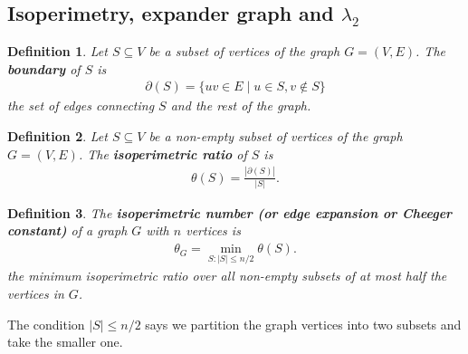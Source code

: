 \documentclass[]{article}
\newtheorem{definition}{Definition}[section] %
\begin{document}
	\subsection{Isoperimetry, expander graph and $\lambda_2$}
	\begin{definition}
		Let $S \subseteq V$ be a subset of vertices of the graph $G=(V,E)$. The \textbf{boundary} of $S$ is 
		\begin{align*}
		\partial(S) = \{uv \in E \mid u \in S, v \notin S\}
		\end{align*}
		the set of edges connecting $S$ and the rest of the graph. 
	\end{definition}
	
	\begin{definition}
		Let $S \subseteq V$ be a non-empty subset of vertices of the graph $G=(V,E)$. The \textbf{isoperimetric ratio} of $S$ is 
		\begin{align*}
		\theta(S) = \frac{|\partial(S)|}{|S|}.
		\end{align*}
	\end{definition}
	
	\begin{definition}
		The \textbf{isoperimetric number (or edge expansion or Cheeger constant)} of a graph $G$ with $n$ vertices is  
		\begin{align*}
		\theta_G = \min_{S:|S|\le n/2} \theta(S).
		\end{align*}
		the minimum isoperimetric ratio over all non-empty subsets of at most half the vertices in $G$.
	\end{definition}
	The condition $|S| \le n/2$ says we partition the graph vertices into two subsets and take the smaller one. 
	
\end{document}
